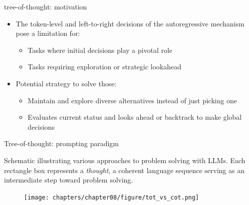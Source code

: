 
\begin{vbframe}{tree-of-thought: motivation}

\vfill

\begin{itemize}
\item The token-level and left-to-right decisions of the autoregressive mechanism pose a limitation for:
    \begin{itemize}
    \item Tasks where initial decisions play a pivotal role
    \item Tasks requiring exploration or strategic lookahead
    \end{itemize}
\item Potential strategy to solve those:
    \begin{itemize}
    \item Maintain and explore diverse alternatives instead of just picking one
    \item Evaluates current status and looks ahead or backtrack to make global decisions
    \end{itemize}

\end{itemize}

\vfill

\end{vbframe}


\begin{vbframe}{Tree-of-thought: prompting paradigm}

\vfill

Schematic illustrating various approaches to problem solving with LLMs. Each rectangle box represents a \textit{thought}, a coherent language sequence serving as an intermediate step toward problem solving.

\begin{figure}
    \centering
    \texttt{[image: chapters/chapter08/figure/tot\_vs\_cot.png]}\\
\end{figure}

\vfill

\end{vbframe}



